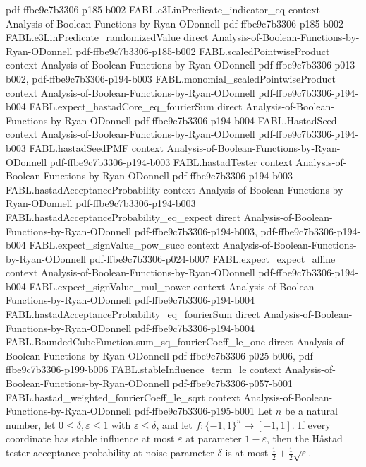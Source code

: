 \begin{theorem}
  {pdf-ffbe9c7b3306-p185-b002}
\proofstep
  {FABL.e3LinPredicate_indicator_eq}
  {context}
  {Analysis-of-Boolean-Functions-by-Ryan-ODonnell}
  {pdf-ffbe9c7b3306-p185-b002}
\proofstep
  {FABL.e3LinPredicate_randomizedValue}
  {direct}
  {Analysis-of-Boolean-Functions-by-Ryan-ODonnell}
  {pdf-ffbe9c7b3306-p185-b002}
\proofstep
  {FABL.scaledPointwiseProduct}
  {context}
  {Analysis-of-Boolean-Functions-by-Ryan-ODonnell}
  {pdf-ffbe9c7b3306-p013-b002,
    pdf-ffbe9c7b3306-p194-b003}
\proofstep
  {FABL.monomial_scaledPointwiseProduct}
  {context}
  {Analysis-of-Boolean-Functions-by-Ryan-ODonnell}
  {pdf-ffbe9c7b3306-p194-b004}
\proofstep
  {FABL.expect_hastadCore_eq_fourierSum}
  {direct}
  {Analysis-of-Boolean-Functions-by-Ryan-ODonnell}
  {pdf-ffbe9c7b3306-p194-b004}
\proofstep
  {FABL.HastadSeed}
  {context}
  {Analysis-of-Boolean-Functions-by-Ryan-ODonnell}
  {pdf-ffbe9c7b3306-p194-b003}
\proofstep
  {FABL.hastadSeedPMF}
  {context}
  {Analysis-of-Boolean-Functions-by-Ryan-ODonnell}
  {pdf-ffbe9c7b3306-p194-b003}
\proofstep
  {FABL.hastadTester}
  {context}
  {Analysis-of-Boolean-Functions-by-Ryan-ODonnell}
  {pdf-ffbe9c7b3306-p194-b003}
\proofstep
  {FABL.hastadAcceptanceProbability}
  {context}
  {Analysis-of-Boolean-Functions-by-Ryan-ODonnell}
  {pdf-ffbe9c7b3306-p194-b003}
\proofstep
  {FABL.hastadAcceptanceProbability_eq_expect}
  {direct}
  {Analysis-of-Boolean-Functions-by-Ryan-ODonnell}
  {pdf-ffbe9c7b3306-p194-b003,
    pdf-ffbe9c7b3306-p194-b004}
\proofstep
  {FABL.expect_signValue_pow_succ}
  {context}
  {Analysis-of-Boolean-Functions-by-Ryan-ODonnell}
  {pdf-ffbe9c7b3306-p024-b007}
\proofstep
  {FABL.expect_expect_affine}
  {context}
  {Analysis-of-Boolean-Functions-by-Ryan-ODonnell}
  {pdf-ffbe9c7b3306-p194-b004}
\proofstep
  {FABL.expect_signValue_mul_power}
  {context}
  {Analysis-of-Boolean-Functions-by-Ryan-ODonnell}
  {pdf-ffbe9c7b3306-p194-b004}
\proofstep
  {FABL.hastadAcceptanceProbability_eq_fourierSum}
  {direct}
  {Analysis-of-Boolean-Functions-by-Ryan-ODonnell}
  {pdf-ffbe9c7b3306-p194-b004}
\proofstep
  {FABL.BoundedCubeFunction.sum_sq_fourierCoeff_le_one}
  {direct}
  {Analysis-of-Boolean-Functions-by-Ryan-ODonnell}
  {pdf-ffbe9c7b3306-p025-b006,
    pdf-ffbe9c7b3306-p199-b006}
\proofstep
  {FABL.stableInfluence_term_le}
  {context}
  {Analysis-of-Boolean-Functions-by-Ryan-ODonnell}
  {pdf-ffbe9c7b3306-p057-b001}
\proofstep
  {FABL.hastad_weighted_fourierCoeff_le_sqrt}
  {context}
  {Analysis-of-Boolean-Functions-by-Ryan-ODonnell}
  {pdf-ffbe9c7b3306-p195-b001}
Let $n$ be a natural number, let $0\leq\delta,\varepsilon\leq1$ with
$\varepsilon\leq\delta$, and let $f:\{-1,1\}^n\to[-1,1]$. If every coordinate has stable
influence at most $\varepsilon$ at parameter $1-\varepsilon$, then the Håstad tester
acceptance probability at noise parameter $\delta$ is at most
$\frac12+\frac12\sqrt{\varepsilon}$.
\end{theorem}

